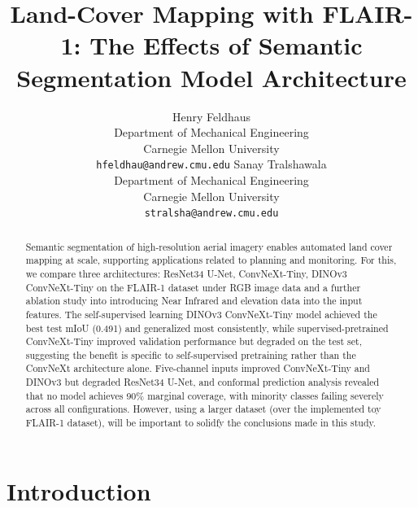 \documentclass{article}
\title{Land-Cover Mapping with FLAIR-1: The Effects of Semantic Segmentation Model Architecture}
\author{
  Henry Feldhaus \\
  Department of Mechanical Engineering \\
  Carnegie Mellon University \\
  \texttt{hfeldhau@andrew.cmu.edu}
  \And
  Sanay Tralshawala \\
  Department of Mechanical Engineering \\
  Carnegie Mellon University \\
  \texttt{stralsha@andrew.cmu.edu}
}
\begin{document}
\maketitle


\begin{abstract}
Semantic segmentation of high-resolution aerial imagery enables automated land cover mapping at scale, supporting applications related to planning and monitoring. For this, we compare three architectures: ResNet34 U-Net, ConvNeXt-Tiny, DINOv3 ConvNeXt-Tiny on the FLAIR-1 dataset under RGB image data and a further ablation study into introducing Near Infrared and elevation data into the input features. The self-supervised learning DINOv3 ConvNeXt-Tiny model achieved the best test mIoU (0.491) and generalized most consistently, while supervised-pretrained ConvNeXt-Tiny improved validation performance but degraded on the test set, suggesting the benefit is specific to self-supervised pretraining rather than the ConvNeXt architecture alone. Five-channel inputs improved ConvNeXt-Tiny and DINOv3 but degraded ResNet34 U-Net, and conformal prediction analysis revealed that no model achieves 90\% marginal coverage, with minority classes failing severely across all configurations. However, using a larger dataset (over the implemented toy FLAIR-1 dataset), will be important to solidfy the conclusions made in this study.

\end{abstract}



\section{Introduction}

\end{document}
